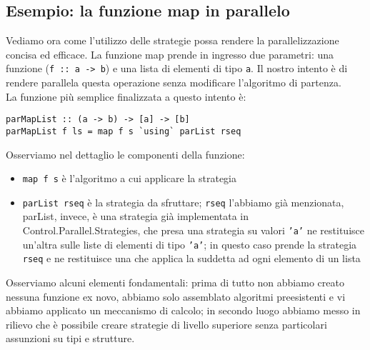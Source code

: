 \subsection{Esempio: la funzione map in parallelo}
Vediamo ora come l'utilizzo delle strategie possa rendere la parallelizzazione concisa ed efficace. La funzione map prende in ingresso due parametri: una funzione (\texttt{f :: a -> b}) e una lista di elementi di tipo \texttt{a}. Il nostro intento è di rendere parallela questa operazione senza modificare l'algoritmo di partenza.\\
La funzione più semplice finalizzata a questo intento è:
\begin{verbatim}
parMapList :: (a -> b) -> [a] -> [b]
parMapList f ls = map f s `using` parList rseq
\end{verbatim}
Osserviamo nel dettaglio le componenti della funzione:
\begin{itemize}
\item{\texttt{map f s} è l'algoritmo a cui applicare la strategia}
\item{\texttt{parList rseq} è la strategia da sfruttare; \texttt{rseq} l'abbiamo già menzionata, parList, invece, è una strategia già implementata in Control.Parallel.Strategies, che presa una strategia su valori \texttt{'a'} ne restituisce un'altra sulle liste di elementi di tipo \texttt{'a'}; in questo caso prende la strategia \texttt{rseq} e ne restituisce una che applica la suddetta ad ogni elemento di un lista}
\end{itemize}
Osserviamo alcuni elementi fondamentali: prima di tutto non abbiamo creato nessuna funzione ex novo, abbiamo solo assemblato algoritmi preesistenti e vi abbiamo applicato un meccanismo di calcolo; in secondo luogo abbiamo messo in rilievo che è possibile creare strategie di livello superiore senza particolari assunzioni su tipi e strutture.

